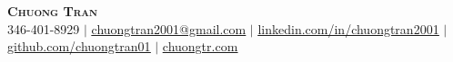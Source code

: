 \begin{center}
	\textbf{\Huge \scshape Chuong Tran} \\ \vspace{1pt}
	\small 346-401-8929 $|$
    \href{mailto:chuongtran2001@gmail.com}{\underline{chuongtran2001@gmail.com}} $|$
	\href{https://www.linkedin.com/in/chuongtran2001/}{\underline{linkedin.com/in/chuongtran2001}} $|$
	\href{https://github.com/chuongtran01}{\underline{github.com/chuongtran01}} $|$
	\href{https://www.chuongtr.com/}{\underline{chuongtr.com}}
\end{center}